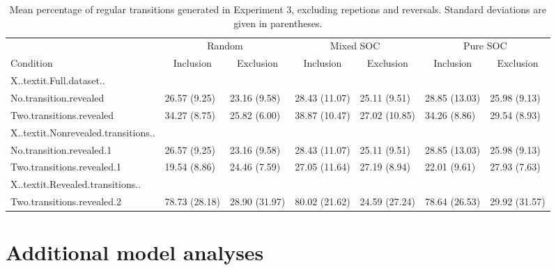 \begin{appendix}
\begin{table}[hp]
\begin{center}
\begin{threeparttable}
\caption{\label{tab:appendix-pdl10-generation}Mean percentage of regular transitions generated in Experiment 3, excluding repetions and reversals. Standard deviations are given in parentheses.}

\begin{tabular}{lllllll}
\toprule
 & \multicolumn{2}{c}{Random} & \multicolumn{2}{c}{Mixed SOC} & \multicolumn{2}{c}{Pure SOC} \\
\cmidrule(r){2-3} \cmidrule(r){4-5} \cmidrule(r){6-7}
Condition & \multicolumn{1}{c}{Inclusion} & \multicolumn{1}{c}{Exclusion} & \multicolumn{1}{c}{Inclusion} & \multicolumn{1}{c}{Exclusion} & \multicolumn{1}{c}{Inclusion} & \multicolumn{1}{c}{Exclusion}\\
\midrule
X..textit.Full.dataset.. &  &  &  &  &  & \\
No.transition.revealed & 26.57 (9.25) & 23.16 (9.58) & 28.43 (11.07) & 25.11 (9.51) & 28.85 (13.03) & 25.98 (9.13)\\
Two.transitions.revealed & 34.27 (8.75) & 25.82 (6.00) & 38.87 (10.47) & 27.02 (10.85) & 34.26 (8.86) & 29.54 (8.93)\\
X..textit.Nonrevealed.transitions.. &  &  &  &  &  & \\
No.transition.revealed.1 & 26.57 (9.25) & 23.16 (9.58) & 28.43 (11.07) & 25.11 (9.51) & 28.85 (13.03) & 25.98 (9.13)\\
Two.transitions.revealed.1 & 19.54 (8.86) & 24.46 (7.59) & 27.05 (11.64) & 27.19 (8.94) & 22.01 (9.61) & 27.93 (7.63)\\
X..textit.Revealed.transitions.. &  &  &  &  &  & \\
Two.transitions.revealed.2 & 78.73 (28.18) & 28.90 (31.97) & 80.02 (21.62) & 24.59 (27.24) & 78.64 (26.53) & 29.92 (31.57)\\
\bottomrule
\end{tabular}

\end{threeparttable}
\end{center}

\end{table}

\hypertarget{additional-model-analyses}{%
\section{Additional model analyses}\label{additional-model-analyses}}

\setlength{\parindent}{0.5in}
\setlength{\leftskip}{0in}
\setlength{\parskip}{0pt}


\end{appendix}

